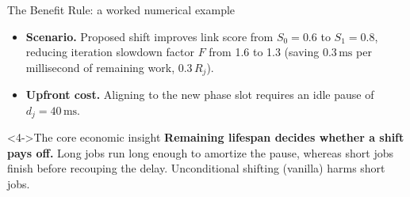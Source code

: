 \documentclass[aspectratio=169,11pt,c]{beamer}
\begin{document}
\begin{frame}{The Benefit Rule: a worked numerical example}
  \footnotesize
  \begin{itemize}[<+->]
    \item \textbf{Scenario.} Proposed shift improves link score from $S_0 = 0.6$ to $S_1 = 0.8$, reducing iteration slowdown factor $F$ from 1.6 to 1.3 (saving $0.3\,\text{ms}$ per millisecond of remaining work, $0.3\,R_j$).
    \item \textbf{Upfront cost.} Aligning to the new phase slot requires an idle pause of $d_j = 40\,\text{ms}$.
  \end{itemize}

  \vspace{0.2em}
  \begin{center}\footnotesize
  \end{center}

  \vspace{0.2em}
  \begin{alertblock}<4->{The core economic insight}
    \scriptsize \textbf{Remaining lifespan decides whether a shift pays off.} Long jobs run long enough to amortize the pause, whereas short jobs finish before recouping the delay. Unconditional shifting (vanilla) harms short jobs.
  \end{alertblock}
\end{frame}
\end{document}
